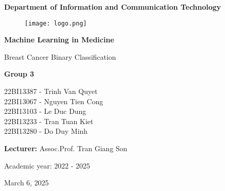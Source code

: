 \documentclass[twocolumn]{article}
\begin{document}
\begin{titlepage}
    \centering
    \vspace*{1cm}
    
    {\LARGE \bfseries Department of Information and Communication Technology \par}

    \begin{figure}[H]
        \centering
        \texttt{[image: logo.png]}
    \end{figure}
    
    \vspace{1cm}
    
    {\Huge \bfseries Machine Learning in Medicine \par}
    
    \vspace{1cm}
    
    {\Large Breast Cancer Binary Classification \par}

    \vspace{2cm}
    
    {\large \textbf{Group 3} \par}
    \vspace{0.5cm}
    {\large 
        22BI13387 - Trinh Van Quyet\\
        22BI13067 - Nguyen Tien Cong\\
        22BI13103 - Le Duc Dung\\
        22BI13233 - Tran Tuan Kiet\\
        22BI13280 - Do Duy Minh \\
    \par}

    \vspace{1.5cm}
    
    {\large \textbf{Lecturer:} Assoc.Prof. Tran Giang Son \par}
    
    \vspace{1.5cm}
    
    {\large Academic year: 2022 - 2025} \par
    
    \vspace{0.5cm}
    
    {March 6, 2025}
    
\end{titlepage}

\onecolumn
\tableofcontents
\newpage       
\end{document}
